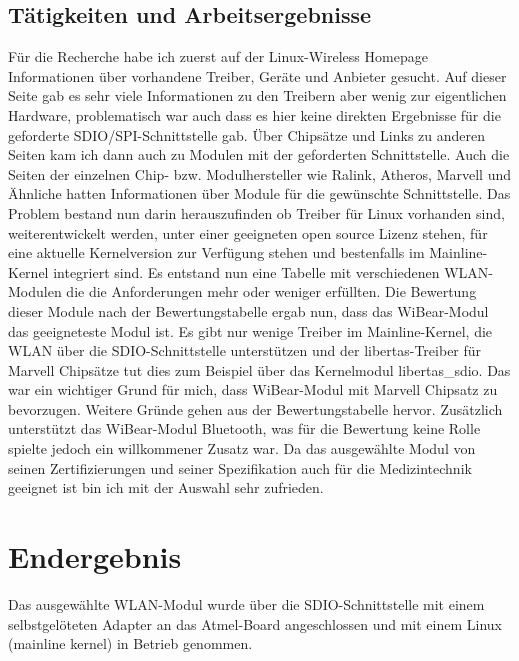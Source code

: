 \documentclass[pdftex,12pt,a4paper]{scrreprt}
\begin{document}
\subsection{Tätigkeiten und Arbeitsergebnisse}
Für die Recherche habe ich zuerst auf der Linux-Wireless Homepage Informationen über vorhandene Treiber, Geräte und Anbieter gesucht. Auf dieser Seite gab es sehr viele Informationen zu den Treibern aber wenig zur eigentlichen Hardware, problematisch war auch dass es hier keine direkten Ergebnisse für die geforderte SDIO/SPI-Schnittstelle gab. Über Chipsätze und Links zu anderen Seiten kam ich dann auch zu Modulen mit der geforderten Schnittstelle. Auch die Seiten der einzelnen Chip- bzw. Modulhersteller wie Ralink, Atheros, Marvell und Ähnliche hatten Informationen über Module für die gewünschte Schnittstelle. Das Problem bestand nun darin herauszufinden ob Treiber für Linux vorhanden sind, weiterentwickelt werden, unter einer geeigneten open source Lizenz stehen, für eine aktuelle Kernelversion zur Verfügung stehen und bestenfalls im Mainline-Kernel integriert sind. Es entstand nun eine Tabelle mit verschiedenen WLAN-Modulen die die Anforderungen mehr oder weniger erfüllten. Die Bewertung dieser Module nach der Bewertungstabelle ergab nun, dass das WiBear-Modul das geeigneteste Modul ist.
Es gibt nur wenige Treiber im Mainline-Kernel, die WLAN über die SDIO-Schnittstelle unterstützen und der libertas-Treiber für Marvell Chipsätze tut dies zum Beispiel über das Kernelmodul libertas\_sdio. Das war ein wichtiger Grund für mich, dass WiBear-Modul mit Marvell Chipsatz zu bevorzugen. Weitere Gründe gehen aus der Bewertungstabelle hervor. Zusätzlich unterstützt das WiBear-Modul Bluetooth, was für die Bewertung keine Rolle spielte jedoch ein willkommener Zusatz war. Da das ausgewählte Modul von seinen Zertifizierungen und seiner Spezifikation auch für die Medizintechnik geeignet ist bin ich mit der Auswahl sehr zufrieden.

\section{Endergebnis}
Das ausgewählte WLAN-Modul wurde über die SDIO-Schnittstelle mit einem selbstgelöteten Adapter an das Atmel-Board angeschlossen und mit einem Linux (mainline kernel) in Betrieb genommen.\\
\end{document}

